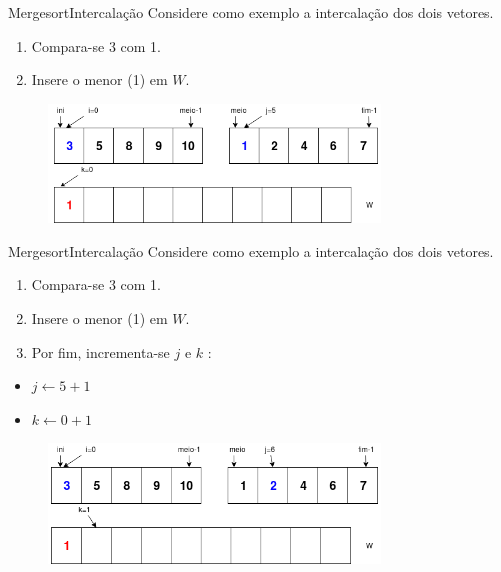 \documentclass[aspectratio=169]{beamer}
\begin{document}
\begin{frame}{Mergesort}{Intercalação}
Considere como exemplo a intercalação dos dois vetores. 
\begin{enumerate}
 \item Compara-se 3 com 1.
 \item Insere o menor (1) em $W$.
\end{enumerate}

\begin{figure}[!h]
  \centering
  \includegraphics[width=250pt]{imgs/merge/merge1_1.png}
  \label{fig_merge1_1}
\end{figure}
\end{frame}


\begin{frame}{Mergesort}{Intercalação}
Considere como exemplo a intercalação dos dois vetores. 
\begin{enumerate}
 \item Compara-se 3 com 1.
 \item Insere o menor (1) em $W$.
 \item Por fim, incrementa-se $j$ e $k$ :
\end{enumerate}
 \begin{itemize}
 \item $j\leftarrow 5 +1$
 \item $k\leftarrow 0 + 1$
 \end{itemize} 

\begin{figure}[!h]
  \centering
  \includegraphics[width=250pt]{imgs/merge/merge2.png}
  \label{fig_merge1_2}
\end{figure}
\end{frame}
\end{document}
